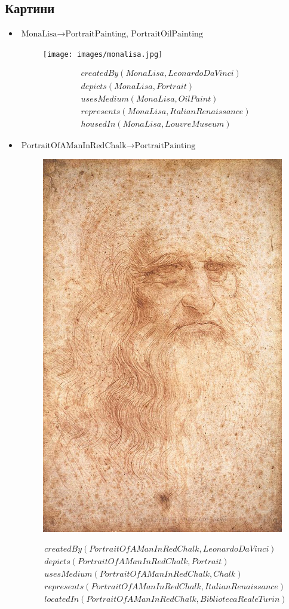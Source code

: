 \documentclass[a4paper, 11pt]{article}
\begin{document}
\subsection*{Картини}
\begin{itemize}
  \item $\text{MonaLisa} \to \text{PortraitPainting, PortraitOilPainting}$
    \begin{figure}[H]
      \centering
      \texttt{[image: images/monalisa.jpg]}
    \end{figure}
    \begin{align*}
      &createdBy(MonaLisa, LeonardoDaVinci)\\
      &depicts(MonaLisa, Portrait)\\
      &usesMedium(MonaLisa, OilPaint)\\
      &represents(MonaLisa, ItalianRenaissance)\\
      &housedIn(MonaLisa, LouvreMuseum)
    \end{align*}
  \item $\text{PortraitOfAManInRedChalk} \to \text{PortraitPainting}$
    \begin{figure}[H]
      \centering
      \includegraphics[width=0.35\linewidth]{images/maninredchalk.jpg}
    \end{figure}
    \begin{align*}
      &createdBy(PortraitOfAManInRedChalk, LeonardoDaVinci)\\
      &depicts(PortraitOfAManInRedChalk, Portrait)\\
      &usesMedium(PortraitOfAManInRedChalk, Chalk)\\
      &represents(PortraitOfAManInRedChalk, ItalianRenaissance)\\
      &locatedIn(PortraitOfAManInRedChalk, BibliotecaRealeTurin)
    \end{align*}

\end{itemize}
\end{document}
